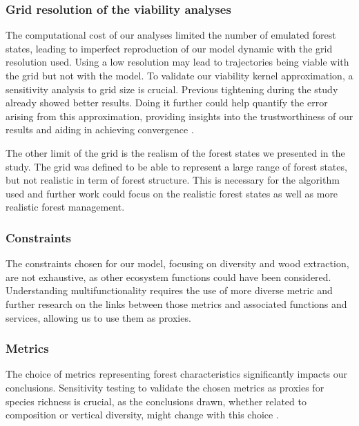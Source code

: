 \documentclass{article}
\begin{document}
\subsubsection{Grid resolution of the viability analyses}

The computational cost of our analyses limited the number of emulated forest states, leading to imperfect reproduction of our model dynamic with the grid resolution used. Using a low resolution may lead to trajectories being viable with the grid but not with the model. To validate our viability kernel approximation, a sensitivity analysis to grid size is crucial. Previous tightening during the study already showed better results. Doing it further could help quantify the error arising from this approximation, providing insights into the trustworthiness of our results and aiding in achieving convergence \autocite{saint-pierreApproximationViabilityKernel1994}.

The other limit of the grid is the realism of the forest states we presented in the study. The grid was defined to be able to represent a large range of forest states, but not realistic in term of forest structure. This is necessary for the algorithm used and further work could focus on the realistic forest states as well as more realistic forest management.

\subsubsection{Constraints}

The constraints chosen for our model, focusing on diversity and wood extraction, are not exhaustive, as other ecosystem functions could have been considered. Understanding multifunctionality requires the use of more diverse metric and further research on the links between those metrics and associated functions and services, allowing us to use them as proxies.

\subsubsection{Metrics}

The choice of metrics representing forest characteristics significantly impacts our conclusions. Sensitivity testing to validate the chosen metrics as proxies for species richness is crucial, as the conclusions drawn, whether related to composition or vertical diversity, might change with this choice \autocite{guldinRoleUnevenAgedSilviculture1996, noletComparingEffectsEven2018}.
\end{document}

